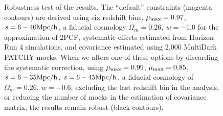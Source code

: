 \documentclass[iop]{emulateapj}
\begin{document}
\begin{figure}
   \caption{\label{fig_contest}
   Robustness test of the results.
   The ``default'' constraints (magenta contours) are derived using six redshift bins, 
   $\mu_{\rm max}=0.97$, $s=6 - 40 \rm Mpc/h$,
   a fiducial cosmology $\Omega_m=0.26,\ w=-1.0$ for the approximation of 2PCF,
   systematic effects estimated from Horizon Run 4 simulations, 
   and covariance estimated using 2,000 MultiDark PATCHY mocks.
   When we alters one of these options by discarding the systematic correction, 
   using $\mu_{\rm max}=0.99$, 
   $\mu_{\rm max}=0.85$, $s=6 - 35 \rm Mpc/h$, $s=6 - 45 \rm Mpc/h$,  
   a fiducial cosmology of $\Omega_m=0.26,\ w=-0.6$, 
   excluding the last redshift bin in the analysis, 
   or reducing the number of mocks in the estimation of covariance matrix,
   the results remain robust (black contours).
   }
\end{figure}
\end{document}
